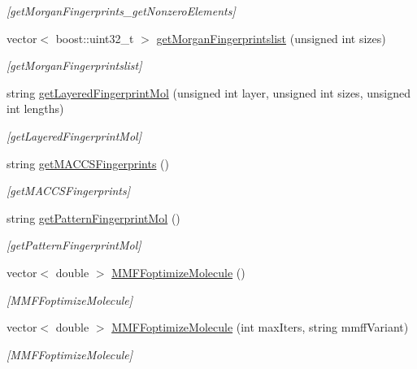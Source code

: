 \begin{DoxyCompactItemize}
\begin{DoxyCompactList}\small\item\em \mbox{[}get\+Morgan\+Fingerprints\+\_\+get\+Nonzero\+Elements\mbox{]} \end{DoxyCompactList}\item 
vector$<$ boost\+::uint32\+\_\+t $>$ \mbox{\hyperlink{class_molecule_aa3eccf55a9d1e512a16d2db64add43d2}{get\+Morgan\+Fingerprintslist}} (unsigned int sizes)
\begin{DoxyCompactList}\small\item\em \mbox{[}get\+Morgan\+Fingerprintslist\mbox{]} \end{DoxyCompactList}\item 
string \mbox{\hyperlink{class_molecule_a337c5373820a171f3cb3edc8ded2bf02}{get\+Layered\+Fingerprint\+Mol}} (unsigned int layer, unsigned int sizes, unsigned int lengths)
\begin{DoxyCompactList}\small\item\em \mbox{[}get\+Layered\+Fingerprint\+Mol\mbox{]} \end{DoxyCompactList}\item 
string \mbox{\hyperlink{class_molecule_ae3c52fdc38e787ce7abb9ec4fb35795c}{get\+M\+A\+C\+C\+S\+Fingerprints}} ()
\begin{DoxyCompactList}\small\item\em \mbox{[}get\+M\+A\+C\+C\+S\+Fingerprints\mbox{]} \end{DoxyCompactList}\item 
string \mbox{\hyperlink{class_molecule_a8d537ddf4c7fe5103a3a8f3025f1cea0}{get\+Pattern\+Fingerprint\+Mol}} ()
\begin{DoxyCompactList}\small\item\em \mbox{[}get\+Pattern\+Fingerprint\+Mol\mbox{]} \end{DoxyCompactList}\item 
vector$<$ double $>$ \mbox{\hyperlink{class_molecule_a5e441ebbeef50a379ed79911805a5124}{M\+M\+F\+Foptimize\+Molecule}} ()
\begin{DoxyCompactList}\small\item\em \mbox{[}M\+M\+F\+Foptimize\+Molecule\mbox{]} \end{DoxyCompactList}\item 
vector$<$ double $>$ \mbox{\hyperlink{class_molecule_a871ec0fe06c07a873ef29d1af4190640}{M\+M\+F\+Foptimize\+Molecule}} (int max\+Iters, string mmff\+Variant)
\begin{DoxyCompactList}\small\item\em \mbox{[}M\+M\+F\+Foptimize\+Molecule\mbox{]} \end{DoxyCompactList}\item 

\end{DoxyCompactItemize}

